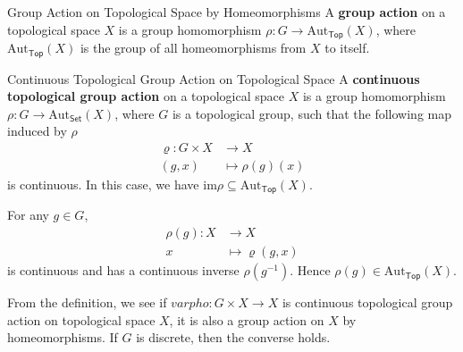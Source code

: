 \begin{definition}{Group Action on Topological Space by Homeomorphisms}{}
	A \textbf{group action} on a topological space $X$ is a group homomorphism $\rho:G\to \mathrm{Aut}_{\mathsf{Top}}(X)$, where $\mathrm{Aut}_{\mathsf{Top}}(X)$ is the group of all homeomorphisms from $X$ to itself.
\end{definition}


\begin{definition}{Continuous Topological Group Action on Topological Space}{}
	A \textbf{continuous topological group action} on a topological space $X$ is a group homomorphism $\rho:G\to \mathrm{Aut}_{\mathsf{Set}}(X)$, where $G$ is a topological group, such that the following map induced by $\rho$ 
	\begin{align*}
		\varrho:G\times X&\longrightarrow X\\
		(g,x)&\longmapsto \rho(g)(x)
	\end{align*}
	is continuous. In this case, we have $\mathrm{im}\rho \subseteq \mathrm{Aut}_{\mathsf{Top}}(X)$.
\end{definition}

\begin{prf}
    For any $g\in G$, 
    \begin{align*}
      \rho(g): X &\longrightarrow X\\
        x &\longmapsto \varrho(g,x)
    \end{align*}
    is continuous and has a continuous inverse $\rho(g^{-1})$. Hence $\rho(g)\in \mathrm{Aut}_{\mathsf{Top}}(X)$.
\end{prf}

From the definition, we see if $varpho:G\times X\to X$ is continuous topological group action on topological space $X$, it is also a group action on $X$ by homeomorphisms. If $G$ is discrete, then the converse holds.

